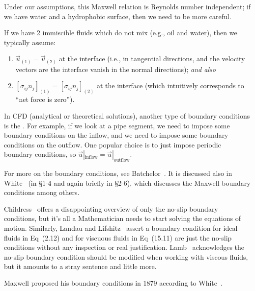 \begin{remark}
Under our assumptions, this Maxwell relation is Reynolds number
independent; if we have water and a hydrophobic surface, then we need
to be more careful.
\end{remark}

\begin{example}
If we have 2 immiscible fluids which do not mix (e.g., oil and water),
then we typically assume:
\begin{enumerate}
\item $\vec{u}_{(1)}=\vec{u}_{(2)}$ at the interface (i.e., in
  tangential directions, and the velocity vectors are the interface
  vanish in the normal directions); \emph{and also}
\item $[\sigma_{ij}n_{j}]_{(1)}=[\sigma_{ij}n_{j}]_{(2)}$ at the
  interface (which intuitively corresponds to ``net force is zero'').
\end{enumerate}
\end{example}

\begin{remark}
In CFD (analytical or theoretical solutions), another type of boundary
conditions is the . For example, if
we look at a pipe segment, we need to impose some boundary conditions
on the inflow, and we need to impose some boundary conditions on the
outflow. One popular choice is to just impose periodic boundary
conditions, so $\vec{u}|_{\text{inflow}}=\vec{u}|_{\text{outflow}}$.
\end{remark}

\begin{remark}
For more on the boundary conditions,
see Batchelor~\cite[\S1.9]{batchelor1973introduction}.
It is discussed also in White~\cite{white1991viscous} (in \S1-4 and
again briefly in \S2-6), which discusses the Maxwell boundary
conditions among others.

Childress~\cite[\S\S2.6,6.2]{childress2009introduction} offers a
disappointing overview of only the no-slip boundary conditions, but
it's all a Mathematician needs to start solving the equations of motion.
Similarly, Landau and Lifshitz~\cite{landau1987fluid} assert a
boundary condition for ideal fluids in Eq~(2.12) and for viscuous
fluids in Eq~(15.11) are just the no-slip conditions without any
inspection or real
justification. Lamb~\cite[\S79]{lamb1930hydrodynamics} acknowledges
the no-slip boundary condition should be modified when working with
viscous fluids, but it amounts to a stray sentence and little more.

Maxwell proposed his boundary conditions in 1879 according to White~\cite[\S1-4.2]{white1991viscous}.
\end{remark}